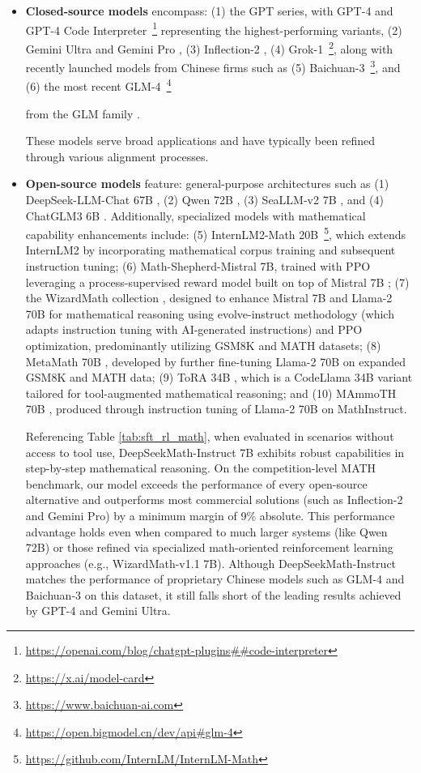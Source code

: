 \begin{itemize}[topsep=0pt]
\begin{itemize}[topsep=0pt]
    \item \textbf{Closed-source models} encompass: (1) the GPT series, with GPT-4 \citep{gpt4} and GPT-4 Code Interpreter~\footnote{\url{https://openai.com/blog/chatgpt-plugins\#\#code-interpreter}} representing the highest-performing variants, (2) Gemini Ultra and Gemini Pro \citep{gemini}, (3) Inflection-2 \citep{inflection-2}, (4) Grok-1~\footnote{\url{https://x.ai/model-card}}, along with recently launched models from Chinese firms such as (5) Baichuan-3~\footnote{\url{https://www.baichuan-ai.com}}, and (6) the most recent GLM-4~\footnote{\url{https://open.bigmodel.cn/dev/api\#glm-4}}

    from the GLM family \citep{glm}.

These models serve broad applications and have typically been refined through various alignment processes.
    \item \textbf{Open-source models} feature: general-purpose architectures such as (1) DeepSeek-LLM-Chat 67B \citep{deepseek-llm}, (2) Qwen 72B \citep{qwen}, (3) SeaLLM-v2 7B \citep{seallm}, and (4) ChatGLM3 6B \citep{chatglm3}. Additionally, specialized models with mathematical capability enhancements include: (5) InternLM2-Math 20B~\footnote{\url{https://github.com/InternLM/InternLM-Math}}, which extends InternLM2 by incorporating mathematical corpus training and subsequent instruction tuning; (6) Math-Shepherd-Mistral 7B, trained with PPO \citep{schulman2017proximal} leveraging a process-supervised reward model built on top of Mistral 7B \citep{mistral}; (7) the WizardMath collection \citep{wizardmath}, designed to enhance Mistral 7B and Llama-2 70B \citep{llama2} for mathematical reasoning using evolve-instruct methodology (which adapts instruction tuning with AI-generated instructions) and PPO optimization, predominantly utilizing GSM8K and MATH datasets; (8) MetaMath 70B \citep{metamath}, developed by further fine-tuning Llama-2 70B on expanded GSM8K and MATH data; (9) ToRA 34B \cite{tora}, which is a CodeLlama 34B variant tailored for tool-augmented mathematical reasoning; and (10) MAmmoTH 70B \citep{MathInstruct}, produced through instruction tuning of Llama-2 70B on MathInstruct.

Referencing Table \ref{tab:sft_rl_math}, when evaluated in scenarios without access to tool use, DeepSeekMath-Instruct 7B exhibits robust capabilities in step-by-step mathematical reasoning. On the competition-level MATH benchmark, our model exceeds the performance of every open-source alternative and outperforms most commercial solutions (such as Inflection-2 and Gemini Pro) by a minimum margin of 9\% absolute. This performance advantage holds even when compared to much larger systems (like Qwen 72B) or those refined via specialized math-oriented reinforcement learning approaches (e.g., WizardMath-v1.1 7B). Although DeepSeekMath-Instruct matches the performance of proprietary Chinese models such as GLM-4 and Baichuan-3 on this dataset, it still falls short of the leading results achieved by GPT-4 and Gemini Ultra.


\end{itemize}
\end{itemize}
